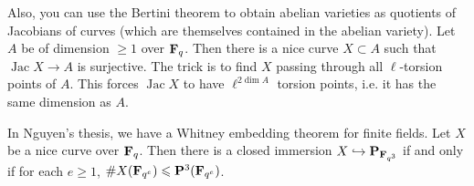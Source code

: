 Also, you can use the Bertini theorem to obtain abelian varieties as quotients 
of Jacobians of curves (which are themselves contained in the abelian variety). 
Let $A$ be of dimension $\geq 1$ over $\mathbf{F}_q$. Then there is a nice curve 
$X\subset A$ such that $\operatorname{Jac} X\to A$ is surjective. The trick 
is to find $X$ passing through all $\ell$-torsion points of $A$. This forces 
$\operatorname{Jac} X$ to have $\ell^{2\dim A}$ torsion points, i.e. it has 
the same dimension as $A$. 

In Nguyen's thesis, we have a Whitney embedding theorem for finite fields. 
Let $X$ be a nice curve over $\mathbf{F}_q$. Then there is a closed immersion 
$X\hookrightarrow \mathbf{P}_{\mathbf{F}_{q^3}}$ if and only if for each $e\geq 1$, 
$\# X(\mathbf{F}_{q^e}) \leqslant \mathbf{P}^3(\mathbf{F}_{q^e})$. 




